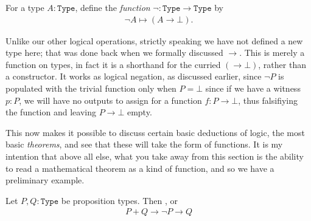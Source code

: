 \documentclass[11pt]{article}
\begin{document}
\begin{definition}
For a type $A\colon \mathtt{Type}$, define the \emph{function} $\neg \colon \mathtt{Type} \to \mathtt{Type}$ by \begin{gather*}
\neg A \mapsto (A \to \bot).
\end{gather*}
\end{definition}

Unlike our other logical operations, strictly speaking we have not defined a new type here; that was done back when we formally discussed $\to$. This is merely a function on types, in fact it is a shorthand for the curried $(\to \bot)$, rather than a constructor. It works as logical negation, as discussed earlier, since $\neg P$ is populated with the trivial function only when $P = \bot$ since if we have a witness $p \colon P$, we will have no outputs to assign for a function $f \colon P \to \bot$, thus falsifiying the function and leaving $P \to \bot$ empty.

This now makes it possible to discuss certain basic deductions of logic, the most basic \emph{theorems}, and see that these will take the form of functions. It is my intention that above all else, what you take away from this section is the ability to read a mathematical theorem as a kind of function, and so we have a preliminary example.

\begin{theorem}
Let $P,Q \colon \mathtt{Type}$ be proposition types. Then , or \begin{gather*}
P + Q \to \neg P \to Q
\end{gather*}
\end{theorem}
\end{document}
